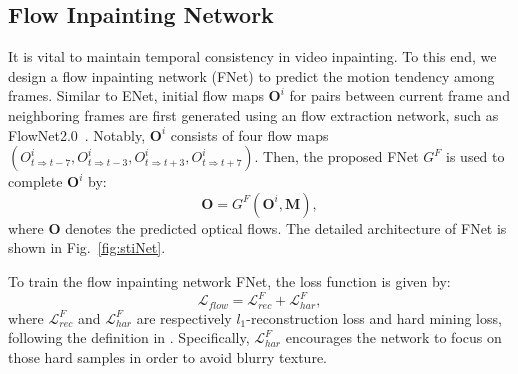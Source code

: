 \subsection{Flow Inpainting Network}

It is vital to maintain temporal consistency in video inpainting.
To this end, we design a flow inpainting network (FNet) to predict the motion tendency among frames.
%
Similar to ENet, initial flow maps \(\boldsymbol{O}^i\) for pairs between current frame and neighboring frames are first generated using an flow extraction network, such as FlowNet2.0~\cite{Flownet_2017_CVPR}.
Notably, \(\boldsymbol{O}^i\) consists of four flow maps \((O^i_{t\Rightarrow t-7}, O^i_{t\Rightarrow t-3}, O^i_{t\Rightarrow t+3}, O^i_{t\Rightarrow t+7})\).
Then, the proposed FNet $G^F$ is used to complete \(\boldsymbol{O}^i\) by:
\begin{equation}
\label{eq:flownet}
\boldsymbol{O}=G^F(\boldsymbol{O}^{i},\boldsymbol{M}),
\end{equation}
where $\boldsymbol{O}$ denotes the predicted optical flows.
%
The detailed architecture of FNet is shown in Fig.~\ref{fig:stiNet}.

To train the flow inpainting network FNet, the loss function is given by:
\begin{equation}
\label{eq:flow_all}
\mathcal{L}_{flow}=\mathcal{L}^F_{rec}+ \mathcal{L}^F_{har},
\end{equation}
where $\mathcal{L}^F_{rec}$ and $\mathcal{L}^F_{har}$ are respectively $l_1$-reconstruction loss and hard mining loss, following the definition in \cite{Xu_2019_CVPR}. 
Specifically, $\mathcal{L}^F_{har}$ encourages the network to focus on those hard samples in order to avoid blurry texture.

%

